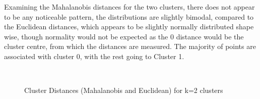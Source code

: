 Examining the Mahalanobis distances for the two clusters, there does not appear to be any noticeable pattern, the distributions are slightly bimodal, compared to the Euclidean distances, which appears to be slightly normally distributed shape wise, though normality would not be expected as the 0 distance would be the cluster centre, from which the distances are measured. The majority of points are associated with cluster 0, with the rest going to Cluster 1.
\begin{figure}[H]
	\centering
	\\
	
	\caption{Cluster Distances (Mahalanobis and Euclidean) for k=2 clusters}
	\label{fig:distk2}
\end{figure}

